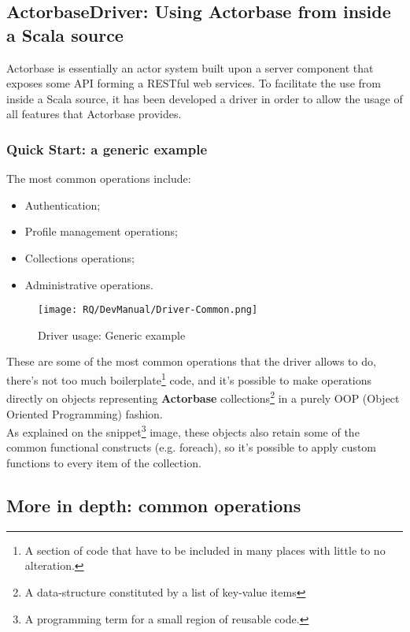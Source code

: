 \documentclass{scalatekids-article}
\begin{document}
\subsection{ActorbaseDriver: Using Actorbase from inside a Scala source}

Actorbase is essentially an actor system built upon a server component that
exposes some API forming a RESTful web services. To facilitate the use from
inside a Scala source, it has been developed a driver in order to allow the
usage of all features that Actorbase provides.\\

\subsubsection{Quick Start: a generic example}

The most common operations include:
\begin{itemize}
\item Authentication;
\item Profile management operations;
\item Collections operations;
\item Administrative operations.
\end{itemize}

\begin{figure}[H]
  \begin{center}
    \texttt{[image: RQ/DevManual/Driver-Common.png]}
    \caption{Driver usage: Generic example}
  \end{center}
\end{figure}

These are some of the most common operations that the driver allows to do,
there's not too much boilerplate\footnote{A section of code that have to be
  included in many places with little to no alteration.} code, and it's possible
to make operations directly on objects representing \textbf{Actorbase}
collections\footnote{A data-structure constituted by a list of key-value items\label{coll}}
in a purely OOP (Object Oriented Programming) fashion.\\ As explained on
the snippet\footnote{A programming term for a small region of reusable code.}
image, these objects also retain some of the common functional constructs (e.g.
foreach), so it's possible to apply custom functions to every item of the
collection.

\subsection{More in depth: common operations}
\end{document}
